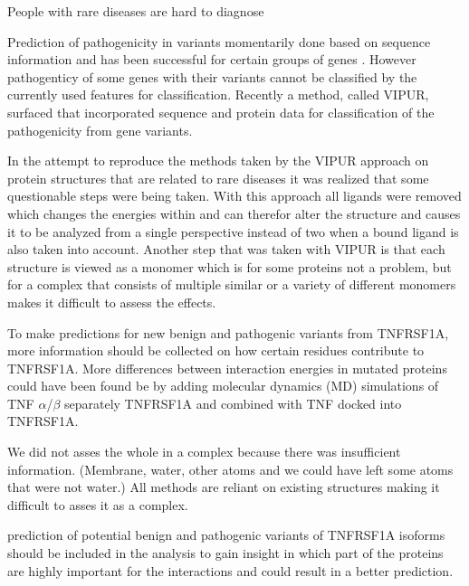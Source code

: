
People with rare diseases are hard to diagnose

Prediction of pathogenicity in variants momentarily done based on sequence information and has been successful for certain groups of genes \cite{}.
However pathogenticy of some genes with their variants cannot be classified by the currently used features for classification. Recently a method, called VIPUR, surfaced that incorporated sequence and protein data for classification of the pathogenicity from gene variants\cite{}. 

In the attempt to reproduce the methods taken by the VIPUR approach on protein structures that are related to rare diseases it was realized that some questionable steps were being taken. With this approach all ligands were removed \cite{} which changes the energies within and can therefor alter the structure \cite{} and causes it to be analyzed from a single perspective instead of two when a bound ligand is also taken into account. 
Another step that was taken with VIPUR is that each structure is viewed as a monomer which is for some proteins not a problem, but for a complex that consists of multiple similar or a variety of different monomers makes it difficult to assess the effects.

To make predictions for new benign and pathogenic variants from TNFRSF1A, more information should be collected on how certain residues contribute to TNFRSF1A. More differences between interaction energies in mutated proteins could have been found be by adding molecular dynamics (MD) simulations of TNF $\alpha$/$\beta$ separately TNFRSF1A and combined with TNF docked into TNFRSF1A.

We did not asses the whole in a complex because there was insufficient information. (Membrane, water, other atoms and we could have left some atoms that were not water.)
All methods are reliant on existing structures making it difficult to asses it as a complex.


 prediction of potential benign and pathogenic variants of TNFRSF1A isoforms should be included in the analysis to gain insight in which part of the proteins are highly important for the interactions and could result in a better prediction.

